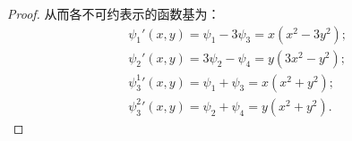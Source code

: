 \documentclass[reqno,a4paper,12pt]{amsart}
\begin{document}
\begin{enumerate}[1.]
\begin{proof}
从而各不可约表示的函数基为：
\begin{align*}
	&\psi_1'(x, y) = \psi_1 - 3\psi_3 = x(x^2-3y^2); \\
	&\psi_2'(x, y) = 3\psi_2 - \psi_4 = y(3x^2-y^2); \\
	&{\psi_3^1}'(x, y) = \psi_1 + \psi_3 = x(x^2+y^2); \\
	&{\psi_3^2}'(x, y) = \psi_2 + \psi_4 = y(x^2+y^2).
\end{align*}

\end{proof}
\end{enumerate}
\end{document}
